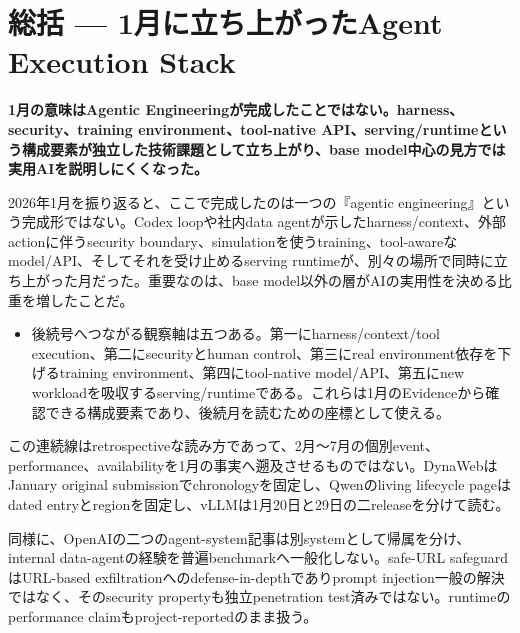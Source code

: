 \section{総括 — 1月に立ち上がったAgent Execution Stack}
\noindent\textbf{1月の意味はAgentic Engineeringが完成したことではない。harness、security、training environment、tool-native API、serving/runtimeという構成要素が独立した技術課題として立ち上がり、base model中心の見方では実用AIを説明しにくくなった。}\autocite{src-0d2abbb0fa62,src-3bc80a3c7870,src-85bc3e4f7b39,src-ae10eb4597fe,src-eac8dfbeb78c}

2026年1月を振り返ると、ここで完成したのは一つの『agentic engineering』という完成形ではない。Codex loopや社内data agentが示したharness/context、外部actionに伴うsecurity boundary、simulationを使うtraining、tool-awareなmodel/API、そしてそれを受け止めるserving runtimeが、別々の場所で同時に立ち上がった月だった。重要なのは、base model以外の層がAIの実用性を決める比重を増したことだ。\autocite{src-0d2abbb0fa62,src-3bc80a3c7870,src-85bc3e4f7b39,src-ae10eb4597fe,src-eac8dfbeb78c,src-fa5410010e0a}


\begin{itemize}
  \item 後続号へつながる観察軸は五つある。第一にharness/context/tool execution、第二にsecurityとhuman control、第三にreal environment依存を下げるtraining environment、第四にtool-native model/API、第五にnew workloadを吸収するserving/runtimeである。これらは1月のEvidenceから確認できる構成要素であり、後続月を読むための座標として使える。
\end{itemize}
\autocite{src-0d2abbb0fa62,src-85bc3e4f7b39,src-ae10eb4597fe,src-d9f9de620203,src-eac8dfbeb78c}

\begin{claimboundary}
この連続線はretrospectiveな読み方であって、2月〜7月の個別event、performance、availabilityを1月の事実へ遡及させるものではない。DynaWebはJanuary original submissionでchronologyを固定し、Qwenのliving lifecycle pageはdated entryとregionを固定し、vLLMは1月20日と29日の二releaseを分けて読む。\autocite{src-3bc80a3c7870,src-85bc3e4f7b39,src-d9f9de620203,src-eac8dfbeb78c}
\end{claimboundary}

\begin{claimboundary}
同様に、OpenAIの二つのagent-system記事は別systemとして帰属を分け、internal data-agentの経験を普遍benchmarkへ一般化しない。safe-URL safeguardはURL-based exfiltrationへのdefense-in-depthでありprompt injection一般の解決ではなく、そのsecurity propertyも独立penetration test済みではない。runtimeのperformance claimもproject-reportedのまま扱う。\autocite{src-0d2abbb0fa62,src-3bc80a3c7870,src-ae10eb4597fe,src-d9f9de620203,src-fa5410010e0a}
\end{claimboundary}

